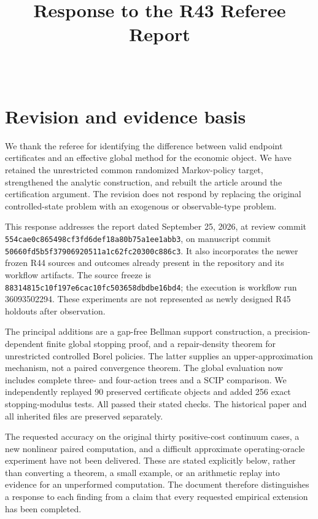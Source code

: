 
\begin{frontmatter}
\title{Response to the R43 Referee Report}
\begin{aug}\author[id=au1,addressref={add1}]{~}\address[id=add1]{}\end{aug}
\end{frontmatter}
\section{Revision and evidence basis}
We thank the referee for identifying the difference between valid endpoint certificates and an effective global method for the economic object. We have retained the unrestricted common randomized Markov-policy target, strengthened the analytic construction, and rebuilt the article around the certification argument. The revision does not respond by replacing the original controlled-state problem with an exogenous or observable-type problem.

This response addresses the report dated September 25, 2026, at review commit \texttt{554cae0c865498cf3fd6def18a80b75a1ee1abb3}, on manuscript commit \texttt{50660fd5b5f37906920511a1c62fc20300c886c3}. It also incorporates the newer frozen R44 sources and outcomes already present in the repository and its workflow artifacts. The source freeze is \texttt{88314815c10f197e6cac10fc503658dbdbe16bd4}; the execution is workflow run 36093502294. These experiments are not represented as newly designed R45 holdouts after observation.

The principal additions are a gap-free Bellman support construction, a precision-dependent finite global stopping proof, and a repair-density theorem for unrestricted controlled Borel policies. The latter supplies an upper-approximation mechanism, not a paired convergence theorem. The global evaluation now includes complete three- and four-action trees and a SCIP comparison. We independently replayed 90 preserved certificate objects and added 256 exact stopping-modulus tests. All passed their stated checks. The historical paper and all inherited files are preserved separately.

The requested accuracy on the original thirty positive-cost continuum cases, a new nonlinear paired computation, and a difficult approximate operating-oracle experiment have not been delivered. These are stated explicitly below, rather than converting a theorem, a small example, or an arithmetic replay into evidence for an unperformed computation. The document therefore distinguishes a response to each finding from a claim that every requested empirical extension has been completed.

